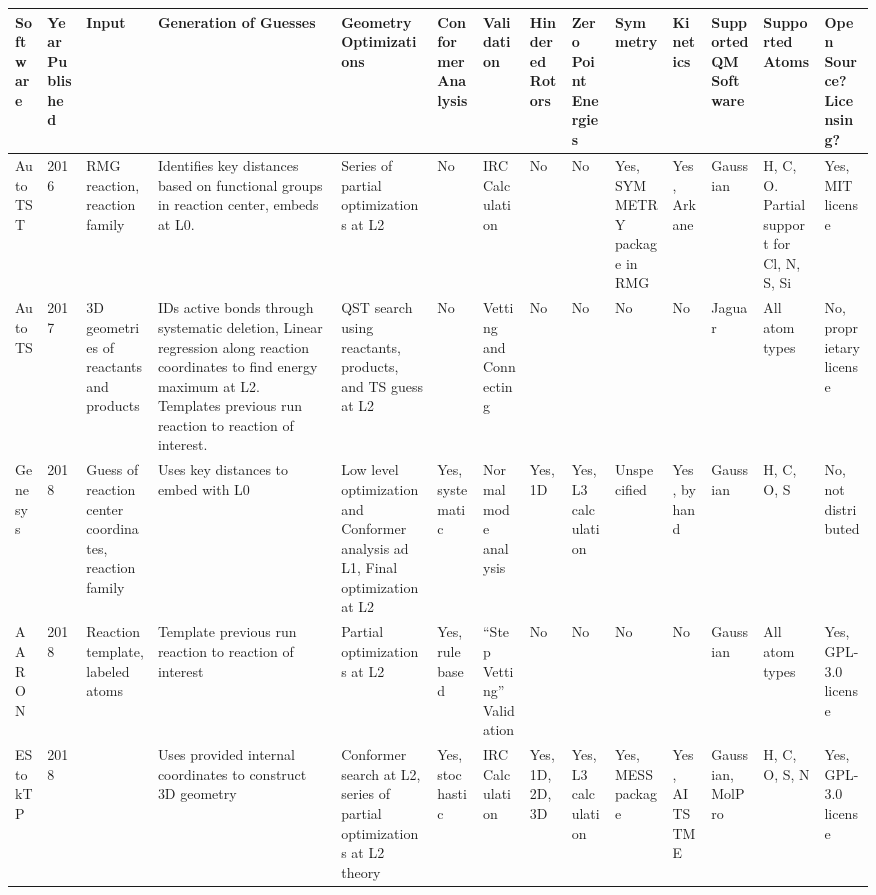 \documentclass[preprint, 11pt]{elsarticle} %
\begin{document}
\begin{center}
\begin{singlespace}
\begin{adjustbox}{angle=90}
\begin{scriptsize}
\begin{tabular}{m{0.45in}||m{0.25in} | m{0.45in} | m{0.8in} | m{0.7in}| m{0.5in}| m{0.5in }|m{0.45in}| m{0.45in}| m{0.5in}| m{0.45in}| m{0.5in}| m{0.5in} | m{0.45in}}
    
    Software & Year Published & Input & Generation of Guesses & Geometry Optimizations & Conformer Analysis & Validation & Hindered Rotors & Zero Point Energies & Symmetry & Kinetics & Supported QM Software & Supported Atoms & Open Source? Licensing? \\
    \hline
    \hline
    AutoTST & 2016 & RMG reaction, reaction family & Identifies key distances based on functional groups in reaction center, embeds at L0. & Series of partial optimizations at L2 & No & IRC Calculation & No & No & Yes, SYMMETRY package in RMG & Yes, Arkane & Gaussian & H, C, O. Partial support for Cl, N, S, Si & Yes, MIT license \\
    \hline
    AutoTS  & 2017 & 3D geometries of reactants and products & IDs active bonds through systematic deletion, Linear regression along reaction coordinates to find energy maximum at L2. Templates previous run reaction to reaction of interest. & QST search using reactants, products, and TS guess at L2 & No & Vetting and Connecting & No & No & No & No & Jaguar & All atom types & No, proprietary license \\
    \hline 
    Genesys & 2018 & Guess of reaction center coordinates, reaction family & Uses key distances to embed with L0 & Low level optimization and Conformer analysis ad L1, Final optimization at L2 & Yes, systematic & Normal mode analysis & Yes, 1D & Yes, L3 calculation & Unspecified & Yes, by hand & Gaussian& H, C, O, S & No, not distributed \\ 
    \hline
    AARON   & 2018 & Reaction template, labeled atoms & Template previous run reaction to reaction of interest & Partial optimizations at L2 & Yes, rule based & ``Step Vetting'' Validation & No & No & No & No & Gaussian & All atom types & Yes, GPL-3.0 license \\ 
    \hline
    EStokTP & 2018 & & Uses provided internal coordinates to construct 3D geometry & Conformer search at L2, series of partial optimizations at L2 theory & Yes, stochastic & IRC Calculation &Yes, 1D, 2D, 3D & Yes, L3 calculation & Yes, MESS package & Yes, AITSTME & Gaussian, MolPro & H, C, O, S, N & Yes, GPL-3.0 license  \\ 

\end{tabular}
\end{scriptsize}
\end{adjustbox}
\end{singlespace}
\end{center}
\end{document}
